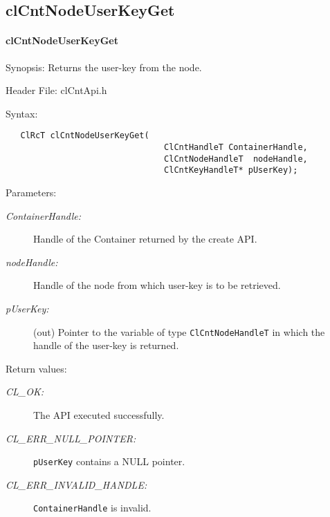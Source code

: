 \subsection{clCntNodeUserKeyGet}
\hypertarget{pagecnt115}{}\paragraph{cl\-Cnt\-Node\-User\-Key\-Get}\label{pagecnt115}
\begin{Desc}
\item[Synopsis:]Returns the user-key from the node.\end{Desc}
\begin{Desc}
\item[Header File:]clCntApi.h\end{Desc}
\begin{Desc}
\item[Syntax:]

\footnotesize\begin{verbatim}   ClRcT clCntNodeUserKeyGet(
              	      			ClCntHandleT ContainerHandle,
                      			ClCntNodeHandleT  nodeHandle,
                      			ClCntKeyHandleT* pUserKey);
\end{verbatim}
\normalsize
\end{Desc}
\begin{Desc}
\item[Parameters:]
\begin{description}
\item[{\em Container\-Handle:}]Handle of the Container returned by the create API. 
\item[{\em node\-Handle:}]Handle of the node from which user-key is to be retrieved. 
\item[{\em p\-User\-Key:}](out) Pointer to the variable of type {\tt{ClCntNodeHandleT}} in which the handle of the user-key is returned.
\end{description}
\end{Desc}
\begin{Desc}
\item[Return values:]
\begin{description}
\item[{\em CL\_\-OK:}]The API executed successfully. 
\item[{\em CL\_\-ERR\_\-NULL\_\-POINTER:}]{\tt{pUserKey}} contains a NULL pointer. 
\item[{\em CL\_\-ERR\_\-INVALID\_\-HANDLE:}]{\tt{ContainerHandle}} is invalid.
\end{description}
\end{Desc}
